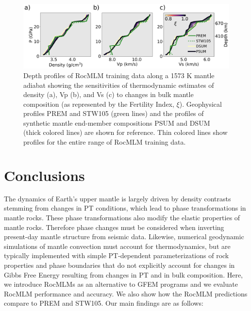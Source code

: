 \documentclass[draft,linenumbers]{agujournal2018}
\begin{document}
\begin{figure}[htbp]

{\centering \includegraphics[width=1\linewidth,]{prem-comps} 

}

\caption{Depth profiles of RocMLM training data along a 1573 K mantle adiabat showing the sensitivities of thermodynamic estimates of density (a), Vp (b), and Vs (c) to changes in bulk mantle composition (as represented by the Fertility Index, \(\xi\)). Geophysical profiles PREM and STW105 (green lines) and the profiles of synthetic mantle end-member compositions PSUM and DSUM (thick colored lines) are shown for reference. Thin colored lines show profiles for the entire range of RocMLM training data.}\label{fig:prem-comps}
\end{figure}

\section{Conclusions}\label{conclusions}

The dynamics of Earth's upper mantle is largely driven by density contrasts stemming from changes in PT conditions, which lead to phase transformations in mantle rocks. These phase transformations also modify the elastic properties of mantle rocks. Therefore phase changes must be considered when inverting present-day mantle structure from seismic data. Likewise, numerical geodynamic simulations of mantle convection must account for thermodynamics, but are typically implemented with simple PT-dependent parameterizations of rock properties and phase boundaries that do not explicitly account for changes in Gibbs Free Energy resulting from changes in PT and in bulk composition. Here, we introduce RocMLMs as an alternative to GFEM programs and we evaluate RocMLM performance and accuracy. We also show how the RocMLM predictions compare to PREM and STW105. Our main findings are as follows:
\end{document}
